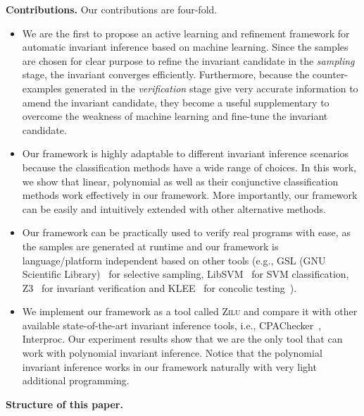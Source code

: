 \medskip\noindent
\textbf{Contributions.}
Our contributions are four-fold. 
\begin{itemize}
    \item 
    We are the first to propose an active learning and refinement framework 
    for automatic invariant inference based on machine learning. 
    Since the samples are chosen for clear purpose 
    to refine the invariant candidate in the \emph{sampling} stage, 
    the invariant converges efficiently. 
    Furthermore, because the counter-examples generated in the \emph{verification} stage 
    give very accurate information to amend the invariant candidate, 
    they become a useful supplementary to overcome the weakness of machine learning 
    and fine-tune the invariant candidate. 
    \item 
    Our framework is highly adaptable to different invariant inference scenarios 
    because the classification methods have a wide range of choices. 
    In this work, we show that linear, polynomial as well as 
    their conjunctive classification methods work effectively in our framework. 
    More importantly, our framework can be easily and intuitively extended with other alternative methods. 
    \item 
    Our framework can be practically used to verify real programs with ease, 
    as the samples are generated at runtime 
    and our framework is language/platform independent based on other tools 
    (e.g., GSL (GNU Scientific Library)~\cite{gough2009gnu} for selective sampling, LibSVM~\cite{chang2011libsvm} for SVM classification, 
    Z3~\cite{de2008z3} for invariant verification and KLEE~\cite{cadar2008klee} for concolic testing~\cite{sen2007concolic}). 
    \item 
    We implement our framework as a tool called \textsc{Zilu} 
    and compare it with other available state-of-the-art invariant inference tools, 
    i.e., CPAChecker~\cite{beyer2011cpachecker}, Interproc. 
    Our experiment results show that 
    we are the only tool that can work with polynomial invariant inference. 
    Notice that the polynomial invariant inference works in our framework 
    naturally with very light additional programming. 
\end{itemize}

\medskip\noindent
\textbf{Structure of this paper.}

